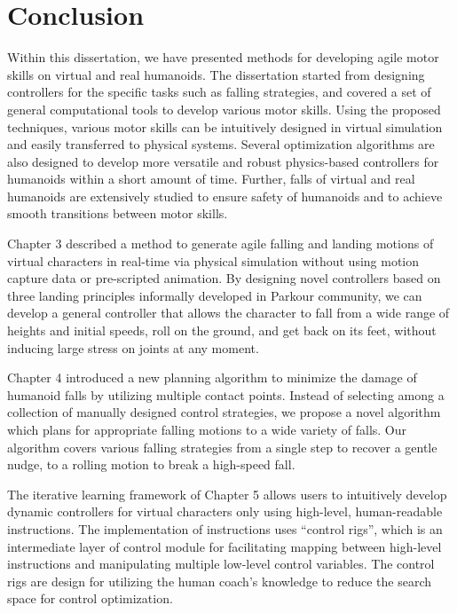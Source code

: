 \chapter{Conclusion}

Within this dissertation, we have presented methods for developing agile motor
skills on virtual and real humanoids.
The dissertation started from designing controllers for the specific tasks
such as falling strategies,
and covered a set of general computational tools to develop
various motor skills.
Using the proposed techniques, various motor skills can be intuitively designed
in virtual simulation and easily transferred to physical systems.
Several optimization algorithms are also designed to develop more versatile and
robust physics-based controllers for humanoids within a short amount of time.
Further, falls of virtual and real humanoids are extensively studied to
ensure safety of humanoids and to achieve smooth transitions between motor
skills.

Chapter 3 described a method to generate agile falling and landing motions of
virtual characters in real-time via physical simulation
without using motion capture data or pre-scripted animation.
By designing novel controllers based on three landing principles informally
developed in Parkour community, we can develop a general controller that
allows the character to fall from a wide range of heights and initial speeds,
roll on the ground, and get back on its feet, without inducing large stress on
joints at any moment.

Chapter 4 introduced a new planning algorithm to minimize the damage
of humanoid falls by utilizing multiple contact points.
Instead of selecting among a collection of manually designed control
strategies, we propose a novel algorithm which plans for appropriate
falling motions to a wide variety of falls.
Our algorithm covers various falling strategies from a single step to recover a
gentle nudge, to a rolling motion to break a high-speed fall.

The iterative learning framework of Chapter 5 allows users to intuitively
develop dynamic controllers for virtual characters only using high-level,
human-readable instructions.
The implementation of instructions uses ``control rigs'', which is an
intermediate layer of control module 
for facilitating mapping between high-level instructions and manipulating
multiple low-level control variables.
The control rigs are design for utilizing the human coach's knowledge to reduce 
the search space for control optimization.


